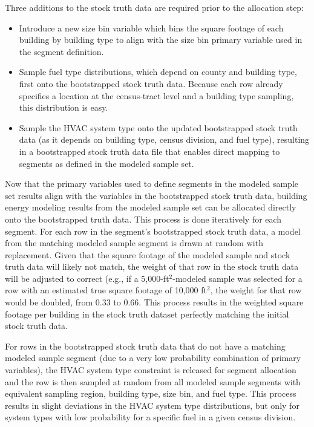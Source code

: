 Three additions to the stock truth data are required prior to the allocation step:
\begin{itemize}
  \item Introduce a new size bin variable which bins the square footage of each building by building type to align with the size bin primary variable used in the segment definition.
  \item Sample fuel type distributions, which depend on county and building type, first onto the bootstrapped stock truth data. Because each row already specifies a location at the census-tract level and a building type sampling, this distribution is easy.
 \item Sample the HVAC system type onto the updated bootstrapped stock truth data (as it depends on building type, census division, and fuel type), resulting in a bootstrapped stock truth data file that enables direct mapping to segments as defined in the modeled sample set.
\end{itemize}

Now that the primary variables used to define segments in the modeled sample set results align with the variables in the bootstrapped stock truth data, building energy modeling results from the modeled sample set can be allocated directly onto the bootstrapped truth data. This process is done iteratively for each segment. For each row in the segment's bootstrapped stock truth data, a model from the matching modeled sample segment is drawn at random with replacement. Given that the square footage of the modeled sample and stock truth data will likely not match, the weight of that row in the stock truth data will be adjusted to correct (e.g., if a 5,000-ft$^2$-modeled sample was selected for a row with an estimated true square footage of 10,000 ft$^2$, the weight for that row would be doubled, from 0.33 to 0.66. This process results in the weighted square footage per building in the stock truth dataset perfectly matching the initial stock truth data.

For rows in the bootstrapped stock truth data that do not have a matching modeled sample segment (due to a very low probability combination of primary variables), the HVAC system type constraint is released for segment allocation and the row is then sampled at random from all modeled sample segments with equivalent sampling region, building type, size bin, and fuel type. This process results in slight deviations in the HVAC system type distributions, but only for system types with low probability for a specific fuel in a given census division.

